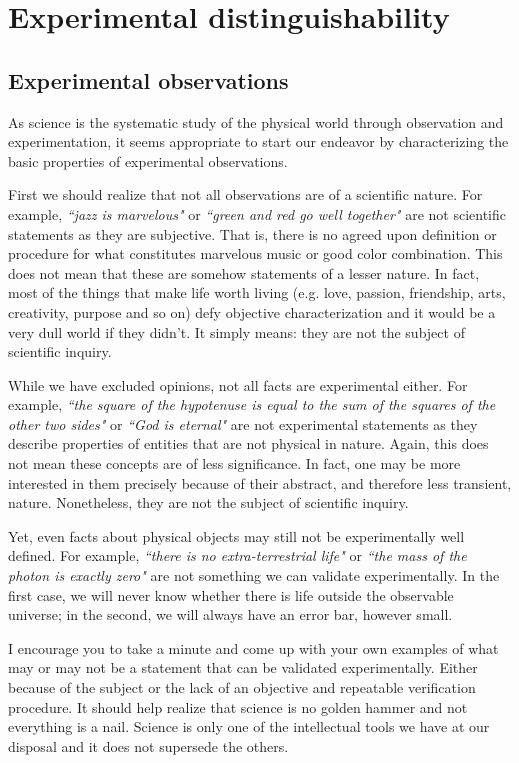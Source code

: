 \documentclass[11pt,letterpaper,fleqn]{memoir} %
\begin{document}
	
\chapter{Experimental distinguishability}

\section{Experimental observations}

As science is the systematic study of the physical world through observation and experimentation, it seems appropriate to start our endeavor by characterizing the basic properties of experimental observations.

First we should realize that not all observations are of a scientific nature. For example, \emph{``jazz is marvelous"} or \emph{``green and red go well together"} are not scientific statements as they are subjective. That is, there is no agreed upon definition or procedure for what constitutes marvelous music or good color combination. This does not mean that these are somehow statements of a lesser nature. In fact, most of the things that make life worth living (e.g. love, passion, friendship, arts, creativity, purpose and so on) defy objective characterization and it would be a very dull world if they didn't. It simply means: they are not the subject of scientific inquiry.

While we have excluded opinions, not all facts are experimental either. For example, \emph{``the square of the hypotenuse is equal to the sum of the squares of the other two sides"} or \emph{``God is eternal"} are not experimental statements as they describe properties of entities that are not physical in nature. Again, this does not mean these concepts are of less significance. In fact, one may be more interested in them precisely because of their abstract, and therefore less transient, nature. Nonetheless, they are not the subject of scientific inquiry.

Yet, even facts about physical objects may still not be experimentally well defined. For example, \emph{``there is no extra-terrestrial life"} or \emph{``the mass of the photon is exactly zero"} are not something we can validate experimentally. In the first case, we will never know whether there is life outside the observable universe; in the second, we will always have an error bar, however small.

I encourage you to take a minute and come up with your own examples of what may or may not be a statement that can be validated experimentally. Either because of the subject or the lack of an objective and repeatable verification procedure. It should help realize that science is no golden hammer and not everything is a nail. Science is only one of the intellectual tools we have at our disposal and it does not supersede the others.
\end{document}
